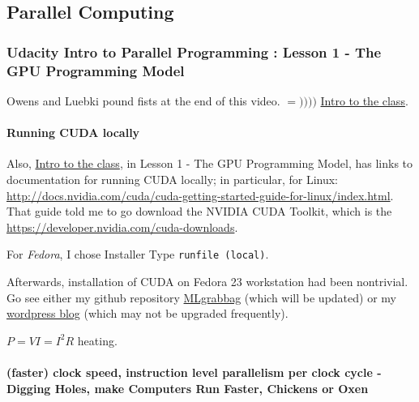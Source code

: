\documentclass[10pt]{amsart}
\begin{document}
\begin{multicols*}{2}
\part{Parallel Computing}


\section{Udacity Intro to Parallel Programming : Lesson 1 - The GPU Programming Model}

Owens and Luebki pound fists at the end of this video.  $=))))$  \href{https://classroom.udacity.com/courses/cs344/lessons/55120467/concepts/658304810923}{Intro to the class}.

\subsection{Running CUDA locally}
Also, \href{https://classroom.udacity.com/courses/cs344/lessons/55120467/concepts/658304810923}{Intro to the class}, in Lesson 1 - The GPU Programming Model, has links to documentation for running CUDA locally; in particular, for Linux: \url{http://docs.nvidia.com/cuda/cuda-getting-started-guide-for-linux/index.html}.  That guide told me to go download the NVIDIA CUDA Toolkit, which is the \href{NVIDIA CUDA Developer Toolkit}{https://developer.nvidia.com/cuda-downloads}.  

For \emph{Fedora}, I chose Installer Type \verb|runfile (local)|.  

Afterwards, installation of CUDA on Fedora 23 workstation had been nontrivial.  Go see either my github repository \href{https://github.com/ernestyalumni/MLgrabbag/blob/master/README.md}{MLgrabbag} (which will be updated) or my \href{https://ernestyalumni.wordpress.com/2016/05/07/fedora-23-workstation-linuxnvidia-geforce-gtx-980-ti-my-experience-log-of-what-i-do-and-find-out/#CUDAinstall}{wordpress blog} (which may not be upgraded frequently).  


$P=VI = I^2R$ heating.

\subsection{(faster) clock speed, instruction level parallelism per clock cycle - Digging Holes, make Computers Run Faster, Chickens or Oxen}


\end{multicols*}
\end{document}
